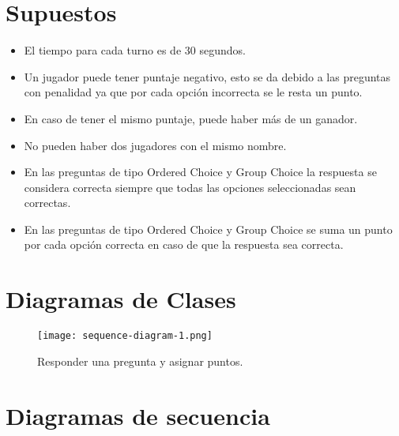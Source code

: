 \documentclass[titlepage,a4paper]{article}
\begin{document}
\section{Supuestos}\label{sec:supuestos}
\begin{itemize}
    \item El tiempo para cada turno es de 30 segundos.
\end{itemize}
\begin{itemize}
    \item Un jugador puede tener puntaje negativo, esto se da debido a las preguntas con penalidad ya que por cada opción incorrecta se le resta un punto.
\end{itemize}
\begin{itemize}
    \item En caso de tener el mismo puntaje, puede haber más de un ganador.
\end{itemize}
\begin{itemize}
    \item No pueden haber dos jugadores con el mismo nombre.
\end{itemize}
\begin{itemize}
    \item En las preguntas de tipo Ordered Choice y Group Choice la respuesta se considera correcta siempre que todas las opciones seleccionadas sean correctas.
\end{itemize}
\begin{itemize}
    \item En las preguntas de tipo Ordered Choice y Group Choice se suma un punto por cada opción correcta en caso de que la respuesta sea correcta.
\end{itemize}


\section{Diagramas de Clases}\label{sec:diagramasdeclases}

\begin{figure}[H]
\centering
\texttt{[image: sequence-diagram-1.png]}
\caption{\label{fig:seq01}Responder una pregunta y asignar puntos.}
\end{figure}


\section{Diagramas de secuencia}\label{sec:diagramasdesecuencia}
\end{document}

